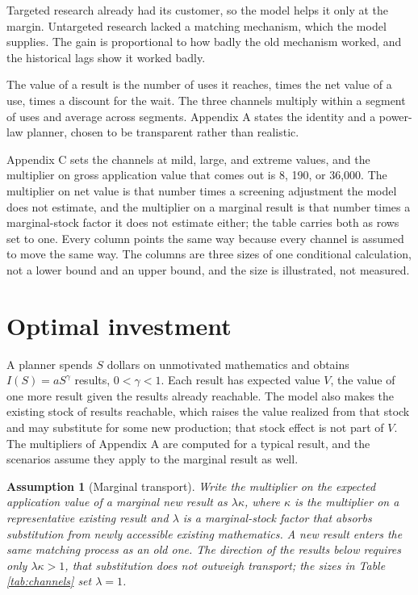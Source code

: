 \documentclass[11pt]{article}
\newtheorem{assumption}{Assumption}
\theoremstyle{definition}
\theoremstyle{remark}
\begin{document}
Targeted research already had its customer, so the model helps it only at the margin. Untargeted research lacked a matching mechanism, which the model supplies. The gain is proportional to how badly the old mechanism worked, and the historical lags show it worked badly.

The value of a result is the number of uses it reaches, times the net value of a use, times a discount for the wait. The three channels multiply within a segment of uses and average across segments. Appendix A states the identity and a power-law planner, chosen to be transparent rather than realistic.

Appendix C sets the channels at mild, large, and extreme values, and the multiplier on gross application value that comes out is 8, 190, or 36{,}000. The multiplier on net value is that number times a screening adjustment the model does not estimate, and the multiplier on a marginal result is that number times a marginal-stock factor it does not estimate either; the table carries both as rows set to one. Every column points the same way because every channel is assumed to move the same way. The columns are three sizes of one conditional calculation, not a lower bound and an upper bound, and the size is illustrated, not measured.

\section{Optimal investment}

A planner spends $S$ dollars on unmotivated mathematics and obtains $I(S) = a S^{\gamma}$ results, $0 < \gamma < 1$. Each result has expected value $V$, the value of one more result given the results already reachable. The model also makes the existing stock of results reachable, which raises the value realized from that stock and may substitute for some new production; that stock effect is not part of $V$. The multipliers of Appendix A are computed for a typical result, and the scenarios assume they apply to the marginal result as well.

\begin{assumption}[Marginal transport]\label{ass:transport}
Write the multiplier on the expected application value of a marginal new result as $\lambda\kappa$, where $\kappa$ is the multiplier on a representative existing result and $\lambda$ is a marginal-stock factor that absorbs substitution from newly accessible existing mathematics. A new result enters the same matching process as an old one. The direction of the results below requires only $\lambda\kappa > 1$, that substitution does not outweigh transport; the sizes in Table \ref{tab:channels} set $\lambda = 1$.
\end{assumption}
\end{document}
